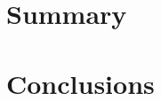 \documentclass[english, 12pt, a4paper, sci, utf8, a-1b, online]{aaltothesis}
\begin{document}
%
%
%
%
%
%

\clearpage
\section{Summary}

\clearpage
\section{Conclusions}

\clearpage
\thesisbibliography

\end{document}
